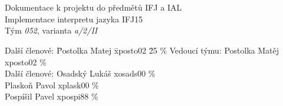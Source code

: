 \documentclass[a4paper, 12pt]{article}
\begin{document}
\begin{titlepage}

\begin{center}
\fontsize{25}{20}\\
\fontsize{21}{0}\textsc{\selectfont{Fakulta informačních technologií}}\\
\begin{figure}[ht]
    \begin{center}
    \end{center}
\end{figure}

\Large{Dokumentace k projektu do předmětů IFJ a IAL}\\
\LARGE{Implementace interpretu jazyka IFJ15}\\
\Large{Tým \textit{052}, varianta \textit{a/2/II}}
\end{center}

\begin{large}
\begin{tabbing}
    Další členové: \quad \= Postolka Matej \quad \= xposto02 \quad \= 25 \%\kill
    Vedoucí týmu:  \> Postolka Matěj \> xposto02  \% \\
    Další členové: \> Osadský Lukáš  \> xosads00  \% \\
             \> Plaskoň Pavol  \> xplask00  \% \\
             \> Pospíšil Pavel \> xpospi88  \% \\
\end{tabbing}
\end{large}

\end{titlepage}
\end{document}
